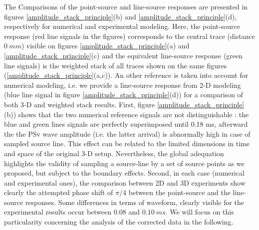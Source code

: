 \documentclass[manuscript,revised]{geophysics}
\newcommand{\twod}{2-D }
\newcommand{\thrd}{3-D }
\begin{document}
\noindent The Comparisons of the point-source and line-source responses are presented in figures \ref{amplitude_stack_principle}(b) and \ref{amplitude_stack_principle}(d), respectively for numerical and experimental modeling. Here, the point-source response (red line signals in the figures) corresponds to the central trace (distance $0\ mm$) visible on figures \ref{amplitude_stack_principle}(a) and \ref{amplitude_stack_principle}(c) and the equivalent line-source response (green line signals) is the weighted stack of all traces shown on the same figures (\ref{amplitude_stack_principle}(a,c)).  An other reference is taken into account for numerical modeling, i.e. we provide a line-source response from \twod modeling (blue line signal in figure \ref{amplitude_stack_principle}(d)) for a comparison of both \thrd and weighted stack results. First, figure \ref{amplitude_stack_principle}(b)) shows that the two numerical reference signals are not distinguishable : the blue and green lines signals are perfectly superimposed until 0.18 ms, afterward the the PSv wave amplitude (i.e. the latter arrival) is abnormally high in case of sampled source line. This effect can be related to the limited dimensions in time and space of the original \thrd setup. Nevertheless, the global adequation highlights the validity of sampling a source-line by a set of source points as we proposed, but subject to the boundary effects. Second, in each case (numerical and experimental ones), the comparison between 2D and 3D experiments show clearly the attempted phase shift of $\pi/4$ between the point-source and the line-source responses. Some differences in terms of waveform, clearly visible for the experimental results occur between $0.08$ and $0.10\ ms$. We will focus on this particularity concerning the analysis of the corrected data in the following.
\end{document}
